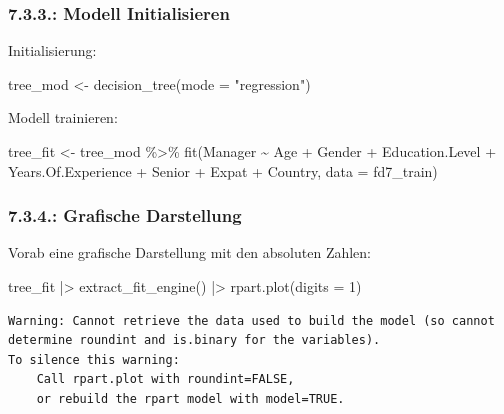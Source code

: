 \documentclass[
  letterpaper,
  DIV=11,
  numbers=noendperiod]{scrartcl}
\newenvironment{Shaded}{\begin{snugshade}}{\end{snugshade}}
\newcommand{\AttributeTok}[1]{\textcolor[rgb]{0.40,0.45,0.13}{#1}}
\newcommand{\DecValTok}[1]{\textcolor[rgb]{0.68,0.00,0.00}{#1}}
\newcommand{\FunctionTok}[1]{\textcolor[rgb]{0.28,0.35,0.67}{#1}}
\newcommand{\NormalTok}[1]{\textcolor[rgb]{0.00,0.23,0.31}{#1}}
\newcommand{\OtherTok}[1]{\textcolor[rgb]{0.00,0.23,0.31}{#1}}
\newcommand{\SpecialCharTok}[1]{\textcolor[rgb]{0.37,0.37,0.37}{#1}}
\newcommand{\StringTok}[1]{\textcolor[rgb]{0.13,0.47,0.30}{#1}}
\begin{document}
\hypertarget{modell-initialisieren-2}{%
\subsubsection{7.3.3.: Modell
Initialisieren}\label{modell-initialisieren-2}}

Initialisierung:

\begin{Shaded}
\begin{Highlighting}[]
\NormalTok{tree\_mod }\OtherTok{\textless{}{-}} \FunctionTok{decision\_tree}\NormalTok{(}\AttributeTok{mode =} \StringTok{"regression"}\NormalTok{)}
\end{Highlighting}
\end{Shaded}

Modell trainieren:

\begin{Shaded}
\begin{Highlighting}[]
\NormalTok{tree\_fit }\OtherTok{\textless{}{-}}\NormalTok{ tree\_mod }\SpecialCharTok{\%\textgreater{}\%} 
  \FunctionTok{fit}\NormalTok{(Manager }\SpecialCharTok{\textasciitilde{}}\NormalTok{ Age }\SpecialCharTok{+}\NormalTok{ Gender }\SpecialCharTok{+}\NormalTok{ Education.Level }\SpecialCharTok{+}\NormalTok{ Years.Of.Experience }\SpecialCharTok{+}\NormalTok{ Senior }\SpecialCharTok{+}\NormalTok{ Expat }\SpecialCharTok{+}\NormalTok{ Country, }\AttributeTok{data =}\NormalTok{ fd7\_train)}
\end{Highlighting}
\end{Shaded}

\hypertarget{grafische-darstellung-2}{%
\subsubsection{7.3.4.: Grafische
Darstellung}\label{grafische-darstellung-2}}

Vorab eine grafische Darstellung mit den absoluten Zahlen:

\begin{Shaded}
\begin{Highlighting}[]
\NormalTok{tree\_fit }\SpecialCharTok{|\textgreater{}} 
  \FunctionTok{extract\_fit\_engine}\NormalTok{() }\SpecialCharTok{|\textgreater{}} 
  \FunctionTok{rpart.plot}\NormalTok{(}\AttributeTok{digits =} \DecValTok{1}\NormalTok{)}
\end{Highlighting}
\end{Shaded}

\begin{verbatim}
Warning: Cannot retrieve the data used to build the model (so cannot determine roundint and is.binary for the variables).
To silence this warning:
    Call rpart.plot with roundint=FALSE,
    or rebuild the rpart model with model=TRUE.
\end{verbatim}
\end{document}
